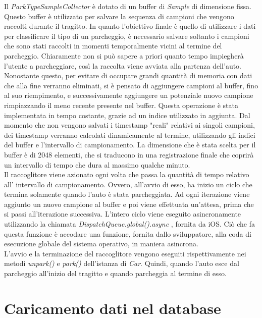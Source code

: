 Il \emph{ParkTypeSampleCollector} è dotato di un buffer di \emph{Sample} di dimensione fissa.
Questo buffer è utilizzato per salvare la sequenza di campioni che vengono raccolti durante
il tragitto. In quanto l'obiettivo finale è quello di utilizzare i dati per classificare 
il tipo di un parcheggio, è necessario salvare soltanto i campioni che sono stati raccolti 
in momenti temporalmente vicini al termine del parcheggio. Chiaramente non si può sapere a 
priori quanto tempo impiegherà l'utente a parcheggiare, così la raccolta viene avviata
alla partenza dell'auto. Nonostante questo, per evitare di occupare grandi quantità di
memoria con dati che alla fine verranno eliminati, si è pensato di aggiungere campioni al
buffer, fino al suo riempimento, e successivamente aggiungere un potenziale nuovo campione 
rimpiazzando il meno recente presente nel buffer. Questa operazione è stata implementata
in tempo costante, grazie ad un indice utilizzato in aggiunta. Dal momento che non vengono
salvati i timestamp "reali" relativi ai singoli campioni, dei timestamp verranno calcolati
dinamicamente al termine, utilizzando gli indici del buffer e l'intervallo di campionamento.
La dimensione che è stata scelta per il buffer è di 2048 elementi, che si traducono in una
registrazione finale che coprirà un intervallo di tempo che dura al massimo qualche minuto.\\
Il raccoglitore viene azionato ogni volta che passa la quantità di tempo relativo all'
intervallo di campionamento. Ovvero, all'avvio di esso, ha inizio un ciclo che
termina solamente quando l'auto è stata parcheggiata. Ad ogni iterazione viene aggiunto un
nuovo campione al buffer e poi viene effettuata un'attesa, prima che si passi all'iterazione
successiva. L'intero ciclo viene eseguito asincronamente utilizzando la chiamata
\emph{DispatchQueue.global().async} \cite{gcd_basics}, fornita da iOS. Ciò che fa questa funzione è
accodare una funzione, fornita dallo sviluppatore, alla coda di esecuzione globale del
sistema operativo, in maniera asincrona.\\
L'avvio e la terminazione del raccoglitore vengono eseguiti rispettivamente nei metodi 
\emph{unpark()} e \emph{park()} dell'istanza di \emph{Car}. Quindi, quando l'auto 
esce dal parcheggio all'inizio del tragitto e quando parcheggia al termine di esso.

\section{Caricamento dati nel database}

